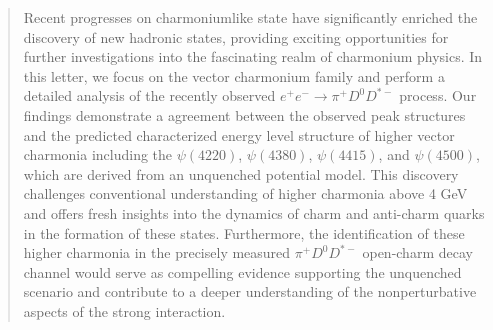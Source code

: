 \documentclass[final,5p,times,twocolumn]{elsarticle}
\begin{document}
\begin{frontmatter}
\author[pku,lzu1]{Jun-Zhang Wang}

\author[lzu1,lzu2,lzu3,lzu4]{Xiang Liu}




\begin{abstract}

Recent progresses on charmoniumlike state have significantly enriched the discovery of new hadronic states, providing exciting opportunities for further investigations into the fascinating realm of charmonium physics. In this letter, we focus on the vector charmonium family and perform a detailed analysis of the recently observed $e^+e^-\to \pi^+ D^0 D^{*-}$ process. Our findings demonstrate a agreement between the observed peak structures and the predicted characterized energy level structure of higher vector charmonia including the $\psi(4220)$, $\psi(4380)$, $\psi(4415)$, and $\psi(4500)$, which are derived from an unquenched potential model. This discovery challenges conventional understanding of higher charmonia above 4 GeV and offers fresh insights into the dynamics of charm and anti-charm quarks in the formation of these states. Furthermore, the identification of these higher charmonia in the precisely measured $\pi^+ D^0D^{*-}$ open-charm decay channel would serve as compelling evidence supporting the unquenched scenario and contribute to a deeper understanding of the nonperturbative aspects of the strong interaction.
\end{abstract}


\end{frontmatter}
\end{document}
